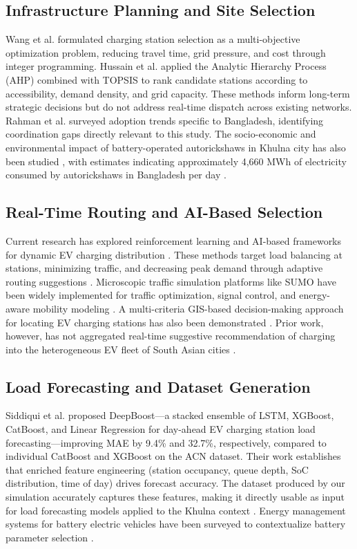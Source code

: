 \documentclass[conference]{IEEEtran}
\begin{document}
\subsection{Infrastructure Planning and Site Selection}

Wang et al. \cite{b5} formulated charging station selection as a multi-objective optimization problem, reducing travel time, grid pressure, and cost through integer programming. Hussain et al. \cite{b6} applied the Analytic Hierarchy Process (AHP) combined with TOPSIS to rank candidate stations according to accessibility, demand density, and grid capacity. These methods inform long-term strategic decisions but do not address real-time dispatch across existing networks. Rahman et al. \cite{b1} surveyed adoption trends specific to Bangladesh, identifying coordination gaps directly relevant to this study. The socio-economic and environmental impact of battery-operated autorickshaws in Khulna city has also been studied \cite{b15}, with estimates indicating approximately 4,660 MWh of electricity consumed by autorickshaws in Bangladesh per day \cite{b13}.

\subsection{Real-Time Routing and AI-Based Selection}

Current research has explored reinforcement learning and AI-based frameworks for dynamic EV charging distribution \cite{b7, b17}. These methods target load balancing at stations, minimizing traffic, and decreasing peak demand through adaptive routing suggestions \cite{b12}. Microscopic traffic simulation platforms like SUMO have been widely implemented for traffic optimization, signal control, and energy-aware mobility modeling \cite{b10, b19}. A multi-criteria GIS-based decision-making approach for locating EV charging stations has also been demonstrated \cite{b18}. Prior work, however, has not aggregated real-time suggestive recommendation of charging into the heterogeneous EV fleet of South Asian cities \cite{b22}.

\subsection{Load Forecasting and Dataset Generation}

Siddiqui et al. \cite{b8} proposed DeepBoost---a stacked ensemble of LSTM, XGBoost, CatBoost, and Linear Regression for day-ahead EV charging station load forecasting---improving MAE by 9.4\% and 32.7\%, respectively, compared to individual CatBoost and XGBoost on the ACN dataset. Their work establishes that enriched feature engineering (station occupancy, queue depth, SoC distribution, time of day) drives forecast accuracy. The dataset produced by our simulation accurately captures these features, making it directly usable as input for load forecasting models applied to the Khulna context \cite{b9}. Energy management systems for battery electric vehicles have been surveyed to contextualize battery parameter selection \cite{b20}.
\end{document}
